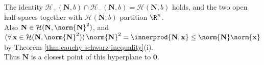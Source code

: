 \begin{remark} \label{rem:hyperplane-basic-geometry} \\
The identity $\mathcal{H}_+(\mathbf{N},b)\cap\mathcal{H}_-(\mathbf{N},b)=\mathcal{H}(\mathbf{N},b)$ holds, and the two open half-spaces together with $\mathcal{H}(\mathbf{N},b)$ partition $\R^n$.\\
Also $\mathbf{N}\in\mathcal{H}(\mathbf{N},\norm{\mathbf{N}}^2)$, and $(\forall\,\mathbf{x}\in\mathcal{H}(\mathbf{N},\norm{\mathbf{N}}^2))\,\norm{\mathbf{N}}^2=\innerprod{\mathbf{N},\mathbf{x}}\leq\norm{\mathbf{N}}\norm{\mathbf{x}}$ by Theorem \ref{thm:cauchy-schwarz-inequality}(i).\\
Thus $\mathbf{N}$ is a closest point of this hyperplane to $\mathbf{0}$.
\end{remark}

